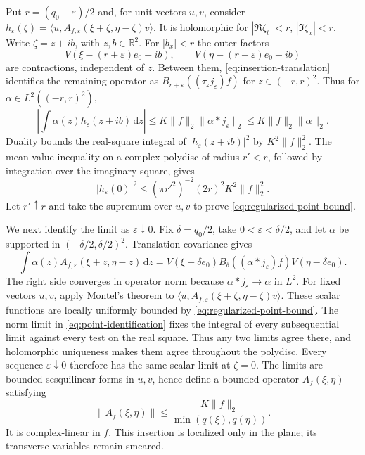 \documentclass[11pt, letterpaper, reqno]{amsart}
\theoremstyle{definition}
\theoremstyle{remark}
\newcommand{\bbR}{\mathbb{R}}
\newcommand{\dd}{\,\mathrm{d}}
\begin{document}
Put $r=(q_0-\varepsilon)/2$ and, for unit vectors $u,v$, consider
$h_\varepsilon(\zeta)=
\langle u,A_{f,\varepsilon}(\xi+\zeta,\eta-\zeta)v\rangle$.
It is holomorphic for $|\Re\zeta_t|<r$, $|\Im\zeta_x|<r$.
Write $\zeta=z+ib$, with $z,b\in\bbR^2$. For $|b_x|<r$ the outer
factors
\begin{equation}
 V(\xi-(r+\varepsilon)e_0+ib),\qquad
 V(\eta-(r+\varepsilon)e_0-ib)
\end{equation}
are contractions, independent of $z$. Between them,
\eqref{eq:insertion-translation} identifies the remaining operator as
$B_{r+\varepsilon}((\tau_zj_\varepsilon)f)$ for
$z\in(-r,r)^2$. Thus for $\alpha\in L^2((-r,r)^2)$,
\begin{equation}
 \left|\int\alpha(z)h_\varepsilon(z+ib)\dd z\right|
 \leq K\|f\|_2\|\alpha*j_\varepsilon\|_2
 \leq K\|f\|_2\|\alpha\|_2.
\end{equation}
Duality bounds the real-square integral of $|h_\varepsilon(z+ib)|^2$
by $K^2\|f\|_2^2$. The mean-value inequality on a complex polydisc
of radius $r'<r$, followed by integration over the imaginary square,
gives
\begin{equation}
 |h_\varepsilon(0)|^2\leq(\pi r'^2)^{-2}(2r)^2K^2\|f\|_2^2.
\end{equation}
Let $r'\uparrow r$ and take the supremum over $u,v$ to prove
\eqref{eq:regularized-point-bound}.

We next identify the limit as $\varepsilon\downarrow0$. Fix
$\delta=q_0/2$, take $0<\varepsilon<\delta/2$, and let $\alpha$ be
supported in $(-\delta/2,\delta/2)^2$. Translation covariance gives
\begin{equation}\label{eq:point-identification}
 \int\alpha(z)A_{f,\varepsilon}(\xi+z,\eta-z)\dd z
 =V(\xi-\delta e_0)B_\delta((\alpha*j_\varepsilon)f)
           V(\eta-\delta e_0).
\end{equation}
The right side converges in operator norm because
$\alpha*j_\varepsilon\to\alpha$ in $L^2$.
For fixed vectors $u,v$, apply Montel's theorem to
$\langle u,A_{f,\varepsilon}(\xi+\zeta,\eta-\zeta)v\rangle$.
These scalar functions are locally uniformly bounded by
\eqref{eq:regularized-point-bound}. The norm limit in
\eqref{eq:point-identification} fixes the integral of every
subsequential limit against every test on the real square. Thus any
two limits agree there, and holomorphic uniqueness makes them agree
throughout the polydisc. Every sequence $\varepsilon\downarrow0$
therefore has the same scalar limit at $\zeta=0$. The limits are
bounded sesquilinear forms in $u,v$, hence define a bounded operator
$A_f(\xi,\eta)$ satisfying
\begin{equation}\label{eq:point-bound}
 \|A_f(\xi,\eta)\|\leq
 \frac{K\|f\|_2}{\min(q(\xi),q(\eta))}.
\end{equation}
It is complex-linear in $f$. This insertion is localized only in the
plane; its transverse variables remain smeared.
\end{document}
